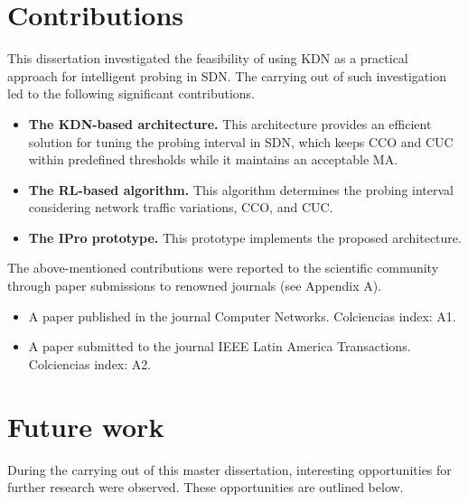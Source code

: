 \section{Contributions}
\label{sec:contributions}

This dissertation investigated the feasibility of using KDN as a practical approach for intelligent probing in SDN. The carrying out of such investigation led to the following significant contributions.

\begin{itemize}
    \item \textbf{The KDN-based architecture.} This architecture provides an efficient solution for tuning the probing interval in SDN, which keeps CCO and CUC within predefined thresholds while it maintains an acceptable MA.
    \item \textbf{The RL-based algorithm.} This algorithm determines the probing interval considering network traffic variations, CCO, and CUC.
    \item \textbf{The IPro prototype.} This prototype implements the proposed architecture.
\end{itemize}{}

The above-mentioned contributions were reported to the scientific community through paper submissions to renowned journals (see Appendix A).

\begin{itemize}
    \item A paper published in the journal Computer Networks. Colciencias index: A1. %
    \item A paper submitted to the journal IEEE Latin America Transactions. Colciencias index: A2. %
\end{itemize}{}


\section{Future work}
\label{sec:future_work}

During the carrying out of this master dissertation, interesting opportunities for further research were observed. These opportunities are outlined below.


